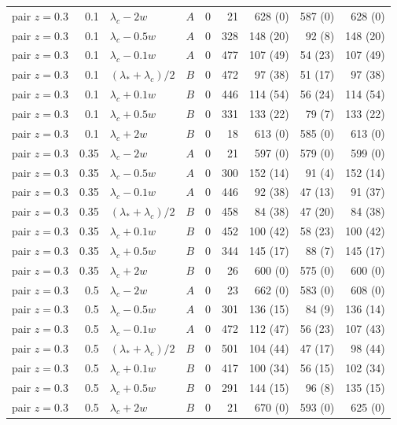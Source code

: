 \begin{longtable}{@{}lrllrrrrr@{}}
pair $z{=}0.3$ & 0.1 & $\lambda_c-2w$ & $A$ & 0 & 21 & 628 (0) & 587 (0) & 628 (0)\\
pair $z{=}0.3$ & 0.1 & $\lambda_c-0.5w$ & $A$ & 0 & 328 & 148 (20) & 92 (8) & 148 (20)\\
pair $z{=}0.3$ & 0.1 & $\lambda_c-0.1w$ & $A$ & 0 & 477 & 107 (49) & 54 (23) & 107 (49)\\
pair $z{=}0.3$ & 0.1 & $(\lambda_*+\lambda_c)/2$ & $B$ & 0 & 472 & 97 (38) & 51 (17) & 97 (38)\\
pair $z{=}0.3$ & 0.1 & $\lambda_c+0.1w$ & $B$ & 0 & 446 & 114 (54) & 56 (24) & 114 (54)\\
pair $z{=}0.3$ & 0.1 & $\lambda_c+0.5w$ & $B$ & 0 & 331 & 133 (22) & 79 (7) & 133 (22)\\
pair $z{=}0.3$ & 0.1 & $\lambda_c+2w$ & $B$ & 0 & 18 & 613 (0) & 585 (0) & 613 (0)\\
pair $z{=}0.3$ & 0.35 & $\lambda_c-2w$ & $A$ & 0 & 21 & 597 (0) & 579 (0) & 599 (0)\\
pair $z{=}0.3$ & 0.35 & $\lambda_c-0.5w$ & $A$ & 0 & 300 & 152 (14) & 91 (4) & 152 (14)\\
pair $z{=}0.3$ & 0.35 & $\lambda_c-0.1w$ & $A$ & 0 & 446 & 92 (38) & 47 (13) & 91 (37)\\
pair $z{=}0.3$ & 0.35 & $(\lambda_*+\lambda_c)/2$ & $B$ & 0 & 458 & 84 (38) & 47 (20) & 84 (38)\\
pair $z{=}0.3$ & 0.35 & $\lambda_c+0.1w$ & $B$ & 0 & 452 & 100 (42) & 58 (23) & 100 (42)\\
pair $z{=}0.3$ & 0.35 & $\lambda_c+0.5w$ & $B$ & 0 & 344 & 145 (17) & 88 (7) & 145 (17)\\
pair $z{=}0.3$ & 0.35 & $\lambda_c+2w$ & $B$ & 0 & 26 & 600 (0) & 575 (0) & 600 (0)\\
pair $z{=}0.3$ & 0.5 & $\lambda_c-2w$ & $A$ & 0 & 23 & 662 (0) & 583 (0) & 608 (0)\\
pair $z{=}0.3$ & 0.5 & $\lambda_c-0.5w$ & $A$ & 0 & 301 & 136 (15) & 84 (9) & 136 (14)\\
pair $z{=}0.3$ & 0.5 & $\lambda_c-0.1w$ & $A$ & 0 & 472 & 112 (47) & 56 (23) & 107 (43)\\
pair $z{=}0.3$ & 0.5 & $(\lambda_*+\lambda_c)/2$ & $B$ & 0 & 501 & 104 (44) & 47 (17) & 98 (44)\\
pair $z{=}0.3$ & 0.5 & $\lambda_c+0.1w$ & $B$ & 0 & 417 & 100 (34) & 56 (15) & 102 (34)\\
pair $z{=}0.3$ & 0.5 & $\lambda_c+0.5w$ & $B$ & 0 & 291 & 144 (15) & 96 (8) & 135 (15)\\
pair $z{=}0.3$ & 0.5 & $\lambda_c+2w$ & $B$ & 0 & 21 & 670 (0) & 593 (0) & 625 (0)\\

\end{longtable}
